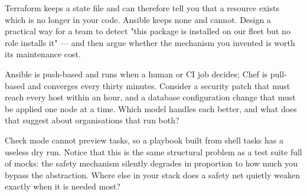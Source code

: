 
\begin{thinkbox}
Terraform keeps a state file and can therefore tell you that a resource exists which is no longer in your code. Ansible keeps none and cannot. Design a practical way for a team to detect "this package is installed on our fleet but no role installs it" --- and then argue whether the mechanism you invented is worth its maintenance cost.
\end{thinkbox}

\begin{thinkbox}
Ansible is push-based and runs when a human or CI job decides; Chef is pull-based and converges every thirty minutes. Consider a security patch that must reach every host within an hour, and a database configuration change that must be applied one node at a time. Which model handles each better, and what does that suggest about organisations that run both?
\end{thinkbox}

\begin{thinkbox}
Check mode cannot preview  tasks, so a playbook built from shell tasks has a useless dry run. Notice that this is the same structural problem as a test suite full of mocks: the safety mechanism silently degrades in proportion to how much you bypass the abstraction. Where else in your stack does a safety net quietly weaken exactly when it is needed most?
\end{thinkbox}


